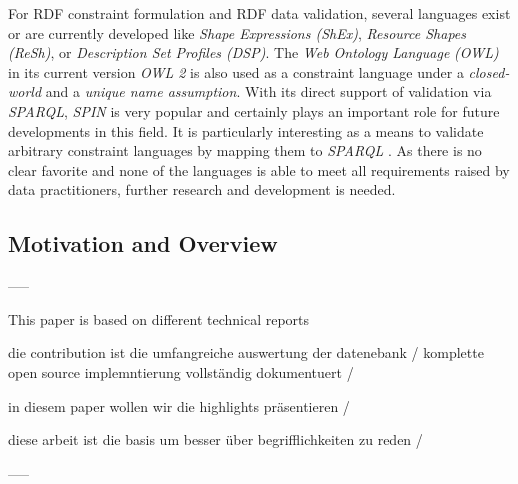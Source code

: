 \documentclass{acm_proc_article-sp}
\begin{document}
For RDF constraint formulation and RDF data validation, several languages exist or are currently developed like \emph{Shape Expressions (ShEx)}, \emph{Resource Shapes (ReSh)}, or \emph{Description Set Profiles (DSP)}. The \emph{Web Ontology Language} \emph{(OWL)} in its current version \emph{OWL 2} is also used as a constraint language under a \emph{closed-world} and a \emph{unique name assumption}. 
With its direct support of validation via \emph{SPARQL}, \emph{SPIN} is very popular and certainly plays an important role for future developments in this field. It is particularly interesting as a means to validate arbitrary constraint languages by mapping them to \emph{SPARQL} \cite{BoschEckert2014-2}. 
As there is no clear favorite and none of the languages is able to meet all requirements raised by data practitioners,
further research and development is needed.

\subsection{Motivation and Overview}
\label{motivation}

-----

This paper is based on different technical reports

die contribution ist die umfangreiche auswertung der datenebank /
komplette open source implemntierung vollständig dokumentuert / 

in diesem paper wollen wir die highlights präsentieren / 

diese arbeit ist die basis um besser über begrifflichkeiten zu reden /

-----
\end{document}
